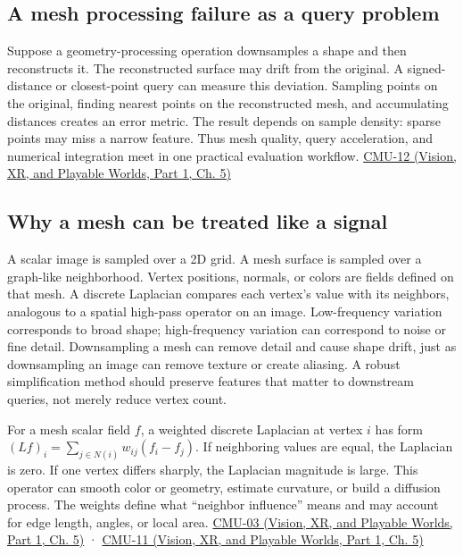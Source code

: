 \subsection{A mesh processing failure as a query problem}\label{03-visual-computing-i-ch002-a-mesh-processing-failure-as-a-query-problem}

\hypertarget{03-visual-computing-i-ch002-a-mesh-processing-failure-as-a-query-problem}{}

Suppose a geometry-processing operation downsamples a shape and then reconstructs it. The reconstructed surface may drift from the original. A signed-distance or closest-point query can measure this deviation. Sampling points on the original, finding nearest points on the reconstructed mesh, and accumulating distances creates an error metric. The result depends on sample density: sparse points may miss a narrow feature. Thus mesh quality, query acceleration, and numerical integration meet in one practical evaluation workflow. \href{../07-Vision-XR-and-Playable-Worlds-P01/main.pdf\#nameddest=04-visual-computing-ii-ch036-cmu-12---geometric-queries}{CMU-12 (Vision, XR, and Playable Worlds, Part 1, Ch. 5)}

\subsection{Why a mesh can be treated like a signal}\label{03-visual-computing-i-ch002-why-a-mesh-can-be-treated-like-a-signal}

\hypertarget{03-visual-computing-i-ch002-why-a-mesh-can-be-treated-like-a-signal}{}

A scalar image is sampled over a 2D grid. A mesh surface is sampled over a graph-like neighborhood. Vertex positions, normals, or colors are fields defined on that mesh. A discrete Laplacian compares each vertex's value with its neighbors, analogous to a spatial high-pass operator on an image. Low-frequency variation corresponds to broad shape; high-frequency variation can correspond to noise or fine detail. Downsampling a mesh can remove detail and cause shape drift, just as downsampling an image can remove texture or create aliasing. A robust simplification method should preserve features that matter to downstream queries, not merely reduce vertex count.

For a mesh scalar field \(f\), a weighted discrete Laplacian at vertex \(i\) has form \((Lf)_i=\sum_{j\in N(i)}w_{ij}(f_i-f_j)\). If neighboring values are equal, the Laplacian is zero. If one vertex differs sharply, the Laplacian magnitude is large. This operator can smooth color or geometry, estimate curvature, or build a diffusion process. The weights define what ``neighbor influence'' means and may account for edge length, angles, or local area. \href{../07-Vision-XR-and-Playable-Worlds-P01/main.pdf\#nameddest=04-visual-computing-ii-ch036-cmu-03---vector-calculus-preview}{CMU-03 (Vision, XR, and Playable Worlds, Part 1, Ch. 5)} · \href{../07-Vision-XR-and-Playable-Worlds-P01/main.pdf\#nameddest=04-visual-computing-ii-ch036-cmu-11---digital-geometry-processing}{CMU-11 (Vision, XR, and Playable Worlds, Part 1, Ch. 5)}

